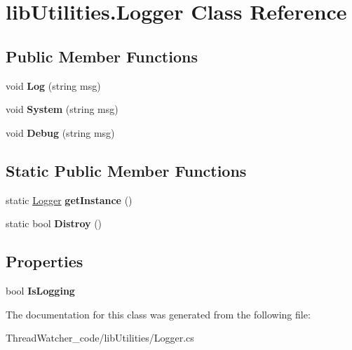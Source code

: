 \hypertarget{classlib_utilities_1_1_logger}{\section{lib\+Utilities.\+Logger Class Reference}
\label{classlib_utilities_1_1_logger}
}
\subsection*{Public Member Functions}
\begin{DoxyCompactItemize}
\item 
\hypertarget{classlib_utilities_1_1_logger_a07931f3d1a53ab4d2fc39bc3b05488af}{void {\bfseries Log} (string msg)}\label{classlib_utilities_1_1_logger_a07931f3d1a53ab4d2fc39bc3b05488af}

\item 
\hypertarget{classlib_utilities_1_1_logger_a764181922661cabd24123e4e2a94a835}{void {\bfseries System} (string msg)}\label{classlib_utilities_1_1_logger_a764181922661cabd24123e4e2a94a835}

\item 
\hypertarget{classlib_utilities_1_1_logger_afbb027b355613e38d86a9ba5fa2356af}{void {\bfseries Debug} (string msg)}\label{classlib_utilities_1_1_logger_afbb027b355613e38d86a9ba5fa2356af}

\end{DoxyCompactItemize}
\subsection*{Static Public Member Functions}
\begin{DoxyCompactItemize}
\item 
\hypertarget{classlib_utilities_1_1_logger_a4e129800ec1604200b70c814c1a998ad}{static \hyperlink{classlib_utilities_1_1_logger}{Logger} {\bfseries get\+Instance} ()}\label{classlib_utilities_1_1_logger_a4e129800ec1604200b70c814c1a998ad}

\item 
\hypertarget{classlib_utilities_1_1_logger_a1f7a5c1f6ba2c75fa0c7bc480482d722}{static bool {\bfseries Distroy} ()}\label{classlib_utilities_1_1_logger_a1f7a5c1f6ba2c75fa0c7bc480482d722}

\end{DoxyCompactItemize}
\subsection*{Properties}
\begin{DoxyCompactItemize}
\item 
\hypertarget{classlib_utilities_1_1_logger_aeec818c0b7c6e7e7c7e2392de8d5f617}{bool {\bfseries Is\+Logging}}\label{classlib_utilities_1_1_logger_aeec818c0b7c6e7e7c7e2392de8d5f617}

\end{DoxyCompactItemize}


The documentation for this class was generated from the following file\+:\begin{DoxyCompactItemize}
\item 
Thread\+Watcher\+\_\+code/lib\+Utilities/Logger.\+cs\end{DoxyCompactItemize}
